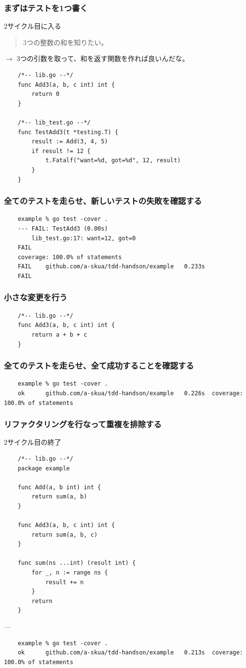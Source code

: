 \documentclass[aspectratio=169]{beamer}
\begin{document}
\begin{frame}[fragile]\frametitle{まずはテストを1つ書く}
  2サイクル目に入る

  \begin{quote}
    \color{blue}
    3つの整数の和を知りたい。
  \end{quote}
  $\rightarrow$ 3つの引数を取って、和を返す関数を作れば良いんだな。

  \scriptsize
  \begin{verbatim}
    /*-- lib.go --*/
    func Add3(a, b, c int) int {
        return 0
    }

    /*-- lib_test.go --*/
    func TestAdd3(t *testing.T) {
        result := Add(3, 4, 5)
        if result != 12 {
            t.Fatalf("want=%d, got=%d", 12, result)
        }
    }
  \end{verbatim}
\end{frame}

\begin{frame}[fragile]\frametitle{全てのテストを走らせ、新しいテストの失敗を確認する}
  \scriptsize
  \begin{verbatim}
    example % go test -cover .
    --- FAIL: TestAdd3 (0.00s)
        lib_test.go:17: want=12, got=0
    FAIL
    coverage: 100.0% of statements
    FAIL	github.com/a-skua/tdd-handson/example	0.233s
    FAIL
  \end{verbatim}
\end{frame}

\begin{frame}[fragile]\frametitle{小さな変更を行う}
  \scriptsize
  \begin{verbatim}
    /*-- lib.go --*/
    func Add3(a, b, c int) int {
        return a + b + c
    }
  \end{verbatim}
\end{frame}

\begin{frame}[fragile]\frametitle{全てのテストを走らせ、全て成功することを確認する}
  \scriptsize
  \begin{verbatim}
    example % go test -cover .
    ok  	github.com/a-skua/tdd-handson/example	0.226s	coverage: 100.0% of statements
  \end{verbatim}
\end{frame}

\begin{frame}[fragile]\frametitle{リファクタリングを行なって重複を排除する}
  2サイクル目の終了
  \scriptsize
  \begin{verbatim}
    /*-- lib.go --*/
    package example

    func Add(a, b int) int {
        return sum(a, b)
    }

    func Add3(a, b, c int) int {
        return sum(a, b, c)
    }

    func sum(ns ...int) (result int) {
        for _, n := range ns {
            result += n
        }
        return
    }
  \end{verbatim}
  ---
  \begin{verbatim}
    example % go test -cover .
    ok  	github.com/a-skua/tdd-handson/example	0.213s	coverage: 100.0% of statements
  \end{verbatim}
\end{frame}
\end{document}
